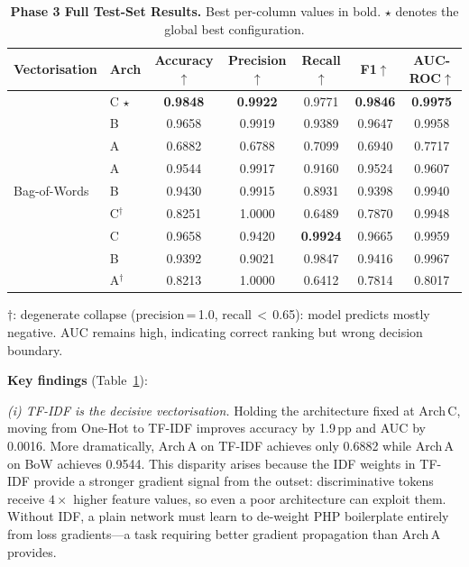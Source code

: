 \documentclass[10pt,conference,letterpaper]{IEEEtran}
\begin{document}
\begin{table}[t]
  \centering
  \caption{\textbf{Phase 3 Full Test-Set Results.} Best per-column values in bold.
           $\star$ denotes the global best configuration.}
  \label{tab:matrix}
  \renewcommand{\arraystretch}{1.15}
  \setlength{\tabcolsep}{7pt}
  \begin{tabular}{llccccc}
    \toprule
    \rowcolor{lightblue}
    \textbf{Vectorisation} & \textbf{Arch} &
    \textbf{Accuracy$\uparrow$} & \textbf{Precision$\uparrow$} &
    \textbf{Recall$\uparrow$} & \textbf{F1$\uparrow$} & \textbf{AUC-ROC$\uparrow$} \\
    \midrule
    \rowcolor{rowblue}
    \multirow{3}{*}{TF-IDF}
     & C $\star$ & \textbf{0.9848} & \textbf{0.9922} & 0.9771 & \textbf{0.9846} & \textbf{0.9975} \\
     & B         & 0.9658 & 0.9919 & 0.9389 & 0.9647 & 0.9958 \\
    \rowcolor{rowblue}
     & A         & 0.6882 & 0.6788 & 0.7099 & 0.6940 & 0.7717 \\
    \midrule
    \multirow{3}{*}{Bag-of-Words}
     & A         & 0.9544 & 0.9917 & 0.9160 & 0.9524 & 0.9607 \\
    \rowcolor{rowblue}
     & B         & 0.9430 & 0.9915 & 0.8931 & 0.9398 & 0.9940 \\
     & C$^\dagger$& 0.8251 & 1.0000 & 0.6489 & 0.7870 & 0.9948 \\
    \midrule
    \rowcolor{rowblue}
    \multirow{3}{*}{One-Hot}
     & C         & 0.9658 & 0.9420 & \textbf{0.9924} & 0.9665 & 0.9959 \\
     & B         & 0.9392 & 0.9021 & 0.9847 & 0.9416 & 0.9967 \\
    \rowcolor{rowblue}
     & A$^\dagger$& 0.8213 & 1.0000 & 0.6412 & 0.7814 & 0.8017 \\
    \bottomrule
  \end{tabular}
  \vspace{2pt}
  {\footnotesize $\dagger$: degenerate collapse (precision\,=\,1.0, recall\,$<$\,0.65):
   model predicts mostly negative. AUC remains high, indicating correct ranking but
   wrong decision boundary.}
\end{table}

\textbf{Key findings} (Table~\ref{tab:matrix}):

\textit{(i) TF-IDF is the decisive vectorisation.}
Holding the architecture fixed at Arch\,C, moving from One-Hot to TF-IDF improves
accuracy by 1.9\,pp and AUC by 0.0016. More dramatically, Arch\,A on TF-IDF
achieves only 0.6882 while Arch\,A on BoW achieves 0.9544. This disparity
arises because the IDF weights in TF-IDF provide a stronger gradient signal from
the outset: discriminative tokens receive $4\times$ higher feature values, so
even a poor architecture can exploit them. Without IDF, a plain network must
learn to de-weight PHP boilerplate entirely from loss gradients---a task requiring
better gradient propagation than Arch\,A provides.
\end{document}
